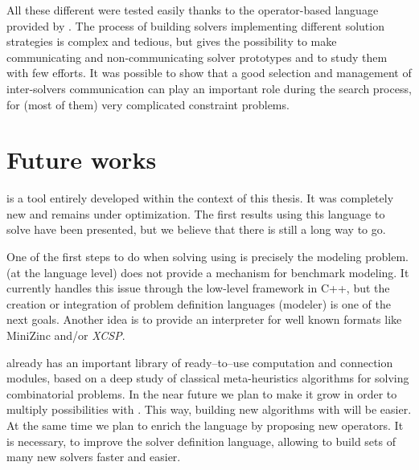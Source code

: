 All these different \commstrs{} were tested easily thanks to the operator-based language provided by \posl{}. The process of building solvers implementing different solution strategies is complex and tedious, but \posl{} gives the possibility to make communicating and non-communicating solver prototypes and to study them with few efforts. It was possible to show that a good selection and management of inter-solvers communication can play an important role during the search process, for (most of them) very complicated constraint problems.

\section{Future works}

\posl{} is a tool entirely developed within the context of this thesis. It was completely new and remains under optimization. The first results using this language to solve \CSPs{} have been presented, but we believe that there is still a long way to go. 

One of the first steps to do when solving \csps{} using \posl{} is precisely the modeling problem. \posl{} (at the language level) does not provide a mechanism for benchmark modeling. It currently handles this issue through the low-level framework in C++, but the creation or integration of problem definition languages (\ie modeler) is one of the next goals. Another idea is to provide an interpreter for well known formats like {\sc MiniZinc} and/or \textit{XCSP}.


\posl{} already has an important library of ready--to--use computation and connection modules, based on a deep study of classical meta-heuristics algorithms for solving combinatorial problems. In the near future we plan to make it grow in order to multiply possibilities with \posl{}. This way, building new algorithms with \posl{} will be easier. At the same time we plan to enrich the language by proposing new operators. It is necessary, to improve the solver definition language, allowing to build sets of many new solvers faster and easier. 

